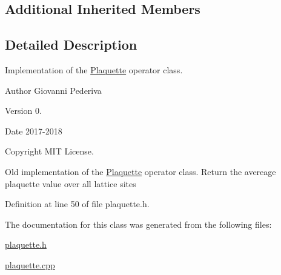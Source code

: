 \subsection*{Additional Inherited Members}


\subsection{Detailed Description}
Implementation of the \hyperlink{classPlaquette}{Plaquette} operator class. 

\begin{DoxyAuthor}{Author}
Giovanni Pederiva 
\end{DoxyAuthor}
\begin{DoxyVersion}{Version}
0. 
\end{DoxyVersion}
\begin{DoxyDate}{Date}
2017-\/2018 
\end{DoxyDate}
\begin{DoxyCopyright}{Copyright}
M\+IT License.
\end{DoxyCopyright}
Old implementation of the \hyperlink{classPlaquette}{Plaquette} operator class. Return the avereage plaquette value over all lattice sites 

Definition at line 50 of file plaquette.\+h.



The documentation for this class was generated from the following files\+:\begin{DoxyCompactItemize}
\item 
\hyperlink{plaquette_8h}{plaquette.\+h}\item 
\hyperlink{plaquette_8cpp}{plaquette.\+cpp}\end{DoxyCompactItemize}
